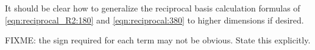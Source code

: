 %
%
It should be clear how to generalize the reciprocal basis calculation formulas of
\cref{eqn:reciprocal_R2:180} and \cref{eqn:reciprocal:380} to higher dimensions if desired.

FIXME: the sign required for each term may not be obvious.  State this explicitly.

